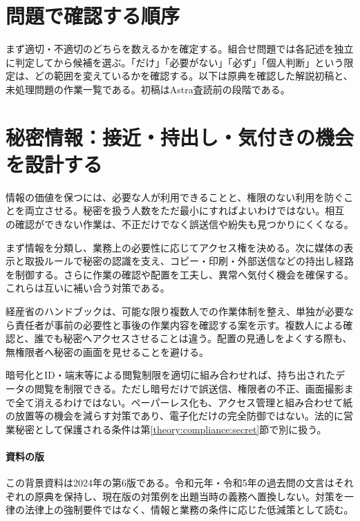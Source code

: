 \section{問題で確認する順序}
まず適切・不適切のどちらを数えるかを確定する。組合せ問題では各記述を独立に判定してから候補を選ぶ。「だけ」「必要がない」「必ず」「個人判断」という限定は、どの範囲を変えているかを確認する。以下は原典を確認した解説初稿と、未処理問題の作業一覧である。初稿はAstra査読前の段階である。
\section{秘密情報：接近・持出し・気付きの機会を設計する}
\label{theory:research:secret_management}
情報の価値を保つには、必要な人が利用できることと、権限のない利用を防ぐことを両立させる。秘密を扱う人数をただ最小にすればよいわけではない。相互の確認ができない作業は、不正だけでなく誤送信や紛失も見つかりにくくなる。

まず情報を分類し、業務上の必要性に応じてアクセス権を決める。次に媒体の表示と取扱ルールで秘密の認識を支え、コピー・印刷・外部送信などの持出し経路を制御する。さらに作業の確認や配置を工夫し、異常へ気付く機会を確保する。これらは互いに補い合う対策である。

経産省のハンドブックは、可能な限り複数人での作業体制を整え、単独が必要なら責任者が事前の必要性と事後の作業内容を確認する案を示す\parencite{meti_secret_handbook2024}。複数人による確認と、誰でも秘密へアクセスさせることは違う。配置の見通しをよくする際も、無権限者へ秘密の画面を見せることを避ける。

暗号化とID・端末等による閲覧制限を適切に組み合わせれば、持ち出されたデータの閲覧を制限できる。ただし暗号だけで誤送信、権限者の不正、画面撮影まで全て消えるわけではない。ペーパーレス化も、アクセス管理と組み合わせて紙の放置等の機会を減らす対策であり、電子化だけの完全防御ではない。法的に営業秘密として保護される条件は第\ref{theory:compliance:secret}節で別に扱う。

\paragraph{資料の版}
この背景資料は2024年の第6版である。令和元年・令和5年の過去問の文言はそれぞれの原典を保持し、現在版の対策例を出題当時の義務へ置換しない。対策を一律の法律上の強制要件ではなく、情報と業務の条件に応じた低減策として読む。




